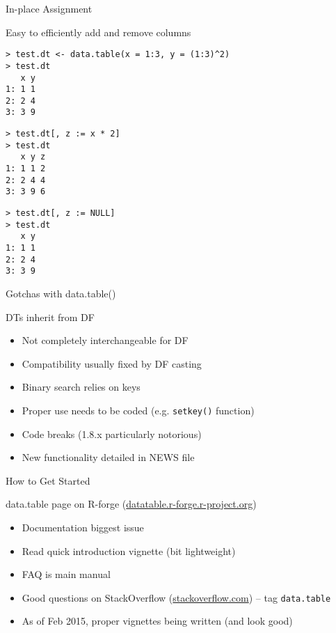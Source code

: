 \documentclass[12pt]{beamer}
\begin{document}
\begin{frame}[fragile]{In-place Assignment}

Easy to efficiently add and remove columns

\pause
\begin{verbatim}
> test.dt <- data.table(x = 1:3, y = (1:3)^2)
> test.dt
   x y
1: 1 1
2: 2 4
3: 3 9
\end{verbatim}

\pause
\begin{verbatim}
> test.dt[, z := x * 2]
> test.dt
   x y z
1: 1 1 2
2: 2 4 4
3: 3 9 6
\end{verbatim}

\pause
\begin{verbatim}
> test.dt[, z := NULL]
> test.dt
   x y
1: 1 1
2: 2 4
3: 3 9
\end{verbatim}

\end{frame}


\begin{frame}{Gotchas with data.table()}

DTs inherit from DF

\begin{itemize}
\item<2-> Not completely interchangeable for DF
\item<3-> Compatibility usually fixed by DF casting
\item<4-> Binary search relies on keys
\item<5-> Proper use needs to be coded (e.g. \texttt{setkey()} function)
\item<6-> Code breaks (1.8.x particularly notorious)
\item<7-> New functionality detailed in NEWS file
\end{itemize}

\end{frame}


\begin{frame}{How to Get Started}

data.table page on R-forge (\url{datatable.r-forge.r-project.org})

\begin{itemize}
\item<2-> Documentation biggest issue
\item<3-> Read quick introduction vignette (bit lightweight)
\item<4-> FAQ is main manual
\item<5-> Good questions on StackOverflow (\url{stackoverflow.com}) -- tag \texttt{data.table}
\item<6-> As of Feb 2015, proper vignettes being written (and look good)
\end{itemize}

\end{frame}
\end{document}

